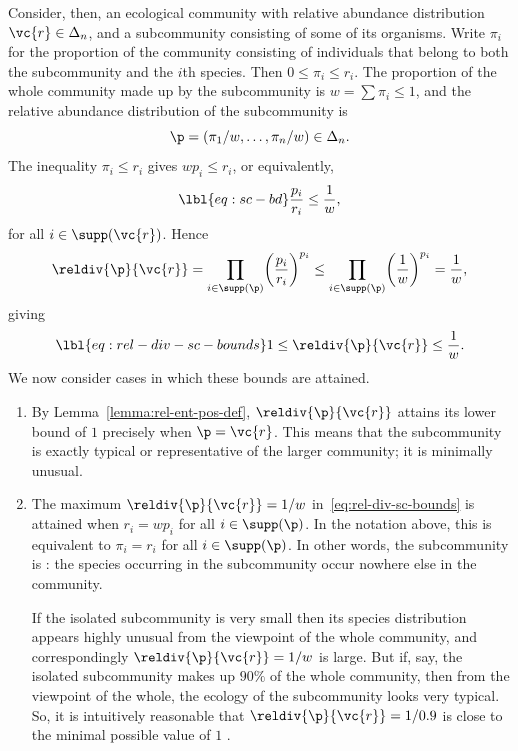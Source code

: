 Consider, then, an ecological community with relative abundance
distribution $\vc{r} \in \Delta_n$, and a subcommunity consisting of some
of its organisms.  Write $\pi_i$ for the proportion of the community
consisting of individuals that belong to both the subcommunity and the
$i$th species.  Then $0 \leq \pi_i \leq r_i$.  The proportion of the whole
community made up by the subcommunity is $w = \sum \pi_i \leq 1$, and
the relative abundance distribution of the subcommunity is
\[
\p = (\pi_1/w, \ldots, \pi_n/w) \in \Delta_n.
\]
The inequality $\pi_i \leq r_i$ gives $w p_i \leq r_i$, or equivalently,
% 
\begin{equation}
\lbl{eq:sc-bd}
\frac{p_i}{r_i} \leq \frac{1}{w},
\end{equation}
% 
for all $i \in \supp(\vc{r})$.  Hence
\[
\reldiv{\p}{\vc{r}}
=
\prod_{i \in \supp(\p)} \biggl( \frac{p_i}{r_i} \biggr)^{p_i}
\leq
\prod_{i \in \supp(\p)} \biggl( \frac{1}{w} \biggr)^{p_i}
=
\frac{1}{w},
\]
giving
% 
\begin{equation}
\lbl{eq:rel-div-sc-bounds}
1 \leq \reldiv{\p}{\vc{r}} \leq \frac{1}{w}.
\end{equation}
% 
We now consider cases in which these bounds are attained.

\begin{examples}
\begin{enumerate}
\item 
{}
By Lemma~\ref{lemma:rel-ent-pos-def}, $\reldiv{\p}{\vc{r}}$ attains its
lower bound of $1$ precisely when $\p = \vc{r}$.  This means that the
subcommunity is exactly typical or representative of the larger community;
it is minimally unusual.

\item
{}
% 
The maximum $\reldiv{\p}{\vc{r}} = 1/w$ in~\eqref{eq:rel-div-sc-bounds} is
attained when $r_i = w p_i$ for all $i \in \supp(\p)$.  In the notation
above, this is equivalent to $\pi_i = r_i$ for all $i \in \supp(\p)$.  In
other words, the subcommunity is : the
species occurring in the subcommunity occur nowhere else in the community.

If the isolated subcommunity is very small then its species distribution
appears highly unusual from the viewpoint of the whole community, and
correspondingly $\reldiv{\p}{\vc{r}} = 1/w$ is large.  But if, say, the
isolated subcommunity makes up $90\%$ of the whole community, then from the
viewpoint of the whole, the ecology of the subcommunity looks very typical.
So, it is intuitively reasonable that $\reldiv{\p}{\vc{r}} = 1/0.9$ is
close to the minimal possible value of $1$ .
\end{enumerate}
\end{examples}


